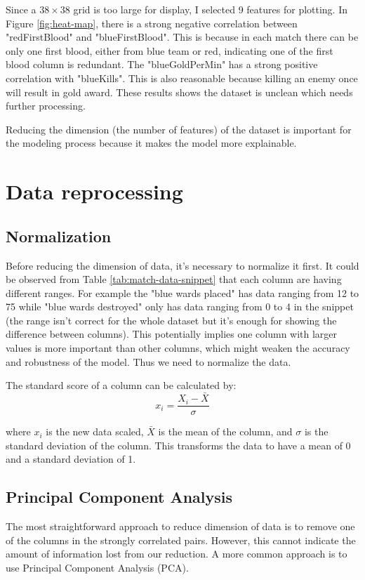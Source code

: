 \documentclass[stu,12pt,floatsintext]{apa7}
\begin{document}
Since a $38\times 38$ grid is too large for display, I selected 9 features for plotting. In Figure \ref{fig:heat-map}, there is a strong negative correlation between "redFirstBlood" and "blueFirstBlood". This is because in each match there can be only one first blood, either from blue team or red, indicating one of the first blood column is redundant. The "blueGoldPerMin" has a strong positive correlation with "blueKills". This is also reasonable because killing an enemy once will result in gold award. These results shows the dataset is unclean which needs further processing. 

Reducing the dimension (the number of features) of the dataset is important for the modeling process because it makes the model more explainable. 

\section{Data reprocessing}

\subsection{Normalization}
Before reducing the dimension of data, it's necessary to normalize it first. It could be observed from Table \ref{tab:match-data-snippet} that each column are having different ranges. For example the "blue wards placed" has data ranging from 12 to 75 while "blue wards destroyed" only has data ranging from 0 to 4 in the snippet (the range isn't correct for the whole dataset but it's enough for showing the difference between columns). This potentially implies one column with larger values is more important than other columns, which might weaken the accuracy and robustness of the model. Thus we need to normalize the data. 

The standard score of a column can be calculated by: 
\begin{equation}
    x_i=\frac{X_i-\bar{X}}{\sigma}
\end{equation}

where $x_i$ is the new data scaled, $\bar{X}$ is the mean of the column, and $\sigma$ is the standard deviation of the column. This transforms the data to have a mean of 0 and a standard deviation of 1.

\subsection{Principal Component Analysis}
\label{sec:pca}
The most straightforward approach to reduce dimension of data is to remove one of the columns in the strongly correlated pairs. However, this cannot indicate the amount of information lost from our reduction. A more common approach is to use Principal Component Analysis (PCA). 
\end{document}
